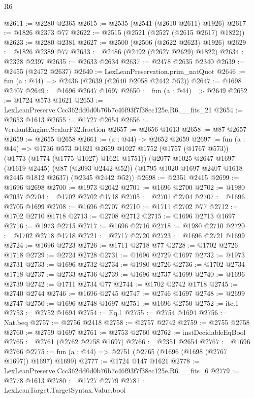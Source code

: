 \begin{lexlean}{R6}
\begin{coremodule}
@2611 := @2280 @2365
@2615 := @2535 (@2541 (@2610 @2611) @1926)
@2617 := @1826 @2373 @77
@2622 := @2515 (@2521 (@2527 (@2615 @2617) @1822))
@2623 := @2280 @2381
@2627 := @2500 (@2506 (@2622 @2623) @1926)
@2629 := @1826 @2389 @77
@2633 := @2486 (@2492 (@2627 @2629) @1822)
@2634 := @2328 @2397
@2635 := @2633 @2634
@2637 := @2478 @2635 @2340
@2639 := @2455 (@2472 @2637)
@2640 := LexLeanPreservation.prim_natQuot
@2646 := fun (a : @44) => @2436 (@2639 (@2640 @2058 @2442 @52))
@2647 := @1698 @2407
@2649 := @1696 @2647 @1697
@2650 := fun (a : @44) => @2649
@2652 := @1724 @573 @1621
@2653 := LexLeanPreserve.Ccc362dd0d0b76b7c46f93f7f38ec125e.R6.__fits_21
@2654 := @2653 @1613
@2655 := @1727 @2654
@2656 := VerdantEngine.ScalarF32.fraction
@2657 := @2656 @1613
@2658 := @87 @2657
@2659 := @2655 @2658
@2661 := (a : @44) -> @2652 @2659
@2697 := fun (a : @44) =>
  @1736
    @573
    @1621
    @2659
    @1027
    @1752
    (@1757 (@1767 @573))
    (@1773 (@1774 (@1775 @1027) @1621 @1751))
    (@2077
      @1025
      @2647
      @1697
      (@1619 @2445)
      (@87 (@2093 @2442 @52))
      (@1795 @1020 @1697 @2407 @1618 @2445 @1812 @2637)
      (@2345 @2442 @52))
@2698 := @2351 @2415
@2699 := @1696 @2698
@2700 := @1973 @2042
@2701 := @1696 @2700
@2702 := @1980 @2037
@2704 := @1702 @2702 @1718
@2705 := @2701 @2704
@2707 := @1696 @2705 @1699
@2708 := @1696 @2707
@2710 := @1711 @2702 @77
@2712 := @1702 @2710 @1718
@2713 := @2708 @2712
@2715 := @1696 @2713 @1697
@2716 := @1973 @2715
@2717 := @1696 @2716
@2718 := @1980 @2710
@2720 := @1702 @2718 @1718
@2721 := @2717 @2720
@2723 := @1696 @2721 @1699
@2724 := @1696 @2723
@2726 := @1711 @2718 @77
@2728 := @1702 @2726 @1718
@2729 := @2724 @2728
@2731 := @1696 @2729 @1697
@2732 := @1973 @2731
@2733 := @1696 @2732
@2734 := @1980 @2726
@2736 := @1702 @2734 @1718
@2737 := @2733 @2736
@2739 := @1696 @2737 @1699
@2740 := @1696 @2739
@2742 := @1711 @2734 @77
@2744 := @1702 @2742 @1718
@2745 := @2740 @2744
@2746 := @1696 @2745
@2747 := @2746 @1697
@2748 := @2699 @2747
@2750 := @1696 @2748 @1697
@2751 := @1696 @2750
@2752 := ite.{1}
@2753 := @2752 @1694
@2754 := Eq.{1}
@2755 := @2754 @1694
@2756 := Nat.beq
@2757 := @2756 @2418
@2758 := @2757 @2742
@2759 := @2755 @2758
@2760 := @2759 @1697
@2761 := @2753 @2760
@2762 := instDecidableEqBool
@2765 := @2761 (@2762 @2758 @1697)
@2766 := @2351 @2654
@2767 := @1696 @2766
@2775 := fun (a : @44) => @2751 (@2765 (@1696 (@1698 (@2767 @1697)) @1697) @1699)
@2777 := @1724 @147 @1621
@2778 := LexLeanPreserve.Ccc362dd0d0b76b7c46f93f7f38ec125e.R6.__fits_6
@2779 := @2778 @1613
@2780 := @1727 @2779
@2781 := LexLeanTarget.TargetSyntax.Value.bool

\end{coremodule}
\end{lexlean}
